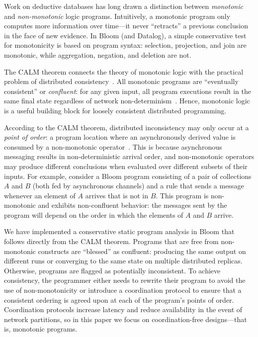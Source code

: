 Work on deductive databases has long drawn a distinction between
\emph{monotonic} and \emph{non-monotonic} logic programs. Intuitively, a
monotonic program only computes more information over time---it never
``retracts'' a previous conclusion in the face of new evidence.  In Bloom
(and Datalog), a simple conservative test for monotonicity is based on program
syntax: selection, projection, and join are monotonic, while aggregation,
negation, and deletion are not.

The CALM theorem connects the theory of monotonic logic with the practical
problem of distributed consistency~\cite{Alvaro2011,Hellerstein2010}.  All
monotonic programs are ``eventually consistent'' or \emph{confluent}: for any
given input, all program executions result in the same final state regardless of
network non-determinism~\cite{Ameloot2011,dedalus-confluence}.  Hence, monotonic
logic is a useful building block for loosely consistent distributed programming.

According to the CALM theorem, distributed inconsistency may only occur at a
\emph{point of order}: a program location where an asynchronously derived value
is consumed by a non-monotonic operator~\cite{Alvaro2011}.  This is because
asynchronous messaging results in non-deterministic arrival order, and
non-monotonic operators may produce different conclusions when evaluated over
different subsets of their inputs.  For example, consider a Bloom program
consisting of a pair of collections $A$ and $B$ (both fed by asynchronous
channels) and a rule that sends a message whenever an element of $A$ arrives
that is not in $B$.  This program is non-monotonic and exhibits non-confluent
behavior: the messages sent by the program will depend on the order in which the
elements of $A$ and $B$ arrive.

We have implemented a conservative static program analysis in Bloom that follows
directly from the CALM theorem.  Programs that are free from non-monotonic
constructs are ``blessed'' as confluent: producing the same output on different
runs or converging to the same state on multiple distributed replicas.
Otherwise, programs are flagged as potentially inconsistent.  To achieve
consistency, the programmer either needs to rewrite their program to avoid the
use of non-monotonicity or introduce a coordination protocol to ensure that a
consistent ordering is agreed upon at each of the program's points of order.
Coordination protocols increase latency and reduce availability in the event of
network partitions, so in this paper we focus on coordination-free
designs---that is, monotonic programs.

